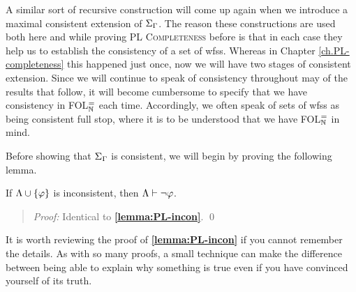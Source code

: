 A similar sort of recursive construction will come up again when we introduce a maximal consistent extension of $\Sigma_{\Gamma}$.
The reason these constructions are used both here and while proving \textsc{PL Completeness} before is that in each case they help us to establish the consistency of a set of wfss.
Whereas in Chapter \ref{ch.PL-completeness} this happened just once, now we will have two stages of consistent extension.
Since we will continue to speak of consistency throughout may of the results that follow, it will become cumbersome to specify that we have consistency in FOL$^=_{\mathbb{N}}$ each time. 
Accordingly, we often speak of sets of wfss as being consistent full stop, where it is to be understood that we have FOL$^=_{\mathbb{N}}$ in mind. 

Before showing that $\Sigma_{\Gamma}$ is consistent, we will begin by proving the following lemma.


%
%
%
%

\begin{Lthm} \label{lemma:incon}
  If $\Lambda\cup\lbrace\varphi\rbrace$ is inconsistent, then $\Lambda\vdash\neg\varphi$. 
\end{Lthm}

\begin{quote} 
  \textit{Proof:}
  Identical to \textbf{\ref{lemma:PL-incon}}.
  \qed
\end{quote}



It is worth reviewing the proof of \textbf{\ref{lemma:PL-incon}} if you cannot remember the details.
As with so many proofs, a small technique can make the difference between being able to explain why something is true even if you have convinced yourself of its truth.



